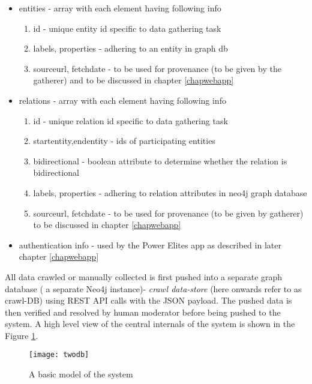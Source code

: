 \begin{itemize}

    \item entities - array with each element having following info
        \begin{enumerate}
            \item id - unique entity id specific to data gathering task
            \item labels, properties - adhering to an entity in graph db
            \item sourceurl, fetchdate - to be used for provenance (to be given by the gatherer) and to be discussed in chapter \ref{chapwebapp}
        \end{enumerate}

    \item relations - array with each element having following info

        \begin{enumerate}
            \item id - unique relation id specific to data gathering task
            \item startentity,endentity - ids of participating entities
            \item bidirectional - boolean attribute to determine whether the relation is bidirectional 
            \item labels, properties - adhering to relation attributes in neo4j graph database
            \item sourceurl, fetchdate - to be used for provenance (to be given by gatherer) to be discussed in chapter \ref{chapwebapp}
        \end{enumerate}

    \item authentication info - used by the Power Elites app as described in later chapter \ref{chapwebapp}

\end{itemize}

All data crawled or manually collected is first pushed into a separate graph database ( a separate Neo4j instance)-  \emph{crawl data-store} (here onwards refer to as crawl-DB) using REST API calls with the JSON payload. The pushed data is then verified and resolved by human moderator before being pushed to the system. A high level view of the central internals of the system is shown in the Figure \ref{fig:twodb}.

\begin{figure}[H]
\begin{center}  
\texttt{[image: twodb]} 
\caption{A basic model of the system}
\label{fig:twodb}
\end{center}
\end{figure}


